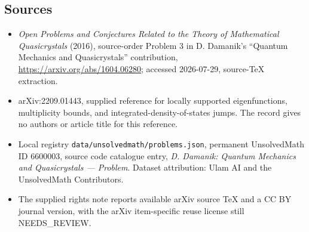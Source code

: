 \documentclass[11pt]{article}
\begin{document}
\subsection{Sources}
\begin{itemize}
\item \emph{Open Problems and Conjectures Related to the Theory of Mathematical Quasicrystals} (2016), source-order Problem 3 in D. Damanik's ``Quantum Mechanics and Quasicrystals'' contribution, \url{https://arxiv.org/abs/1604.06280}; accessed 2026-07-29, source-TeX extraction.
\item arXiv:2209.01443, supplied reference for locally supported eigenfunctions, multiplicity bounds, and integrated-density-of-states jumps. The record gives no authors or article title for this reference.
\item Local registry \texttt{data/unsolvedmath/problems.json}, permanent UnsolvedMath ID $6600003$, source code catalogue entry, \emph{D. Damanik: Quantum Mechanics and Quasicrystals --- Problem}. Dataset attribution: Ulam AI and the UnsolvedMath Contributors.
\item The supplied rights note reports available arXiv source TeX and a CC BY journal version, with the arXiv item-specific reuse license still NEEDS\_REVIEW.
\end{itemize}
\end{document}
